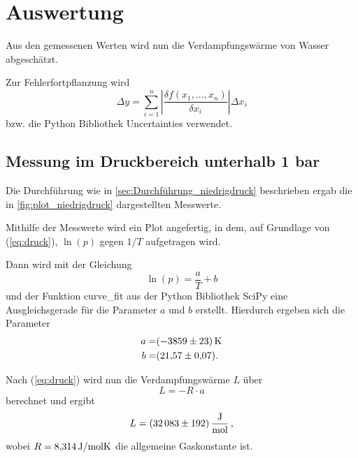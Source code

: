 \section{Auswertung}
\label{sec:Auswertung}



Aus den gemessenen Werten wird nun die Verdampfungswärme von Wasser abgeschätzt.

Zur Fehlerfortpflanzung wird 
\begin{equation}
    \Delta y = \sum_{i=1}^n \left| \frac{\delta f(x_1,...,x_n)}{\delta x_i} \right| \Delta x_i
    \label{eq:fehlerrechnung}
\end{equation}
bzw. die Python Bibliothek Uncertainties verwendet.\cite{uncertainties}

\subsection{Messung im Druckbereich unterhalb 1 bar}
\label{sec:Auswertung_niedrigdruck}

Die Durchführung wie in \autoref{sec:Durchführung_niedrigdruck} beschrieben ergab die in \autoref{fig:plot_niedrigdruck} dargestellten Messwerte.

Mithilfe der Messwerte wird ein Plot angefertig, in dem, auf Grundlage von (\ref{eq:druck}), $\ln(p)$ gegen $1/T$ aufgetragen wird.

Dann wird mit der Gleichung
\begin{equation}
    \ln(p) = \frac{a}{T} + b
\end{equation}
und der Funktion curve\_fit aus der Python Bibliothek SciPy eine Ausgleichsgerade für die Parameter $a$ und $b$ erstellt.\cite{scipy} Hierdurch ergeben sich die Parameter
\begin{align*}
    a =& \SI{-3859+-23}{\kelvin} \\
    b =& \SI{21.57+-0.07}{}.
    \label{eq:niedrigdruck_parameter}
\end{align*}

Nach (\ref{eq:druck}) wird nun die Verdampfungswärme $L$ über
\begin{equation}
    L = -R \cdot a
\end{equation}
berechnet und ergibt
\begin{equation*}
    L = \SI{32083+-192}{\joule\per\mol} \, \text{,}
\end{equation*}
wobei $R=\SI{8.314}{\joule\per{\mol\kelvin}}$ die allgemeine Gaskonstante ist.\cite{physics_constants}

